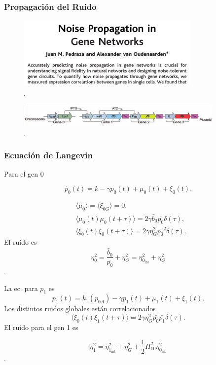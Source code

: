 \documentclass[10pt]{beamer}
\begin{document}
\begin{frame}
\frametitle{Propagaci\'on del Ruido}
\begin{figure}[p]
    \centering
    \includegraphics[width=0.8\textwidth]{pedtitle.png}\\
    \tiny \cite{pedraza05}.
\end{figure}

\begin{figure}[p]
    \centering
    \includegraphics[width=0.9\textwidth]{circuitex.png}\\
    \tiny \cite{pedraza05}.
\end{figure}

\end{frame}

\begin{frame}
\frametitle{Ecuaci\'on de Langevin}

Para el gen $0$

\begin{equation*}
  \dot{p_0}(t) = k - \gamma p_0(t) + \mu_0(t) + \xi_{0}(t).
\end{equation*}

\begin{align*}
  &\langle \mu_0 \rangle = \langle \xi_{0G} \rangle = 0,\\
  &\langle \mu_0(t)\mu_0(t+\tau) \rangle = 2 \gamma \tilde{b_0} \overline{p_0} \delta(\tau),\\
  &\langle \xi_{0}(t)\xi_{0}(t+\tau) \rangle = 2 \gamma \eta_G^2 \overline{p_0}^2 \delta(\tau).
\end{align*}
El ruido es
$$\eta_0^2 = \frac{\tilde{b_0}}{\overline{p_0}} + \eta_G^2 = \eta_{0_{\text{int}}}^2 + \eta_G^2$$.
\end{frame}

\begin{frame}

La ec. para $p_1$ es
  \begin{equation*}
    \dot{p_1}(t) = k_1(p_{0A}) - \gamma p_1(t) + \mu_1(t) + \xi_{1}(t).
  \end{equation*}
Los distintos ruidos globales est\'an correlacionados
  \begin{equation*}
    \langle \xi_{0}(t)\xi_{1}(t+\tau) \rangle = 2 \gamma \eta_G^2 \bar{p_0}\bar{p_1} \delta(\tau).
  \end{equation*}
El ruido para el gen 1 es

$$\eta_1^2 = \eta_{1_{\text{int}}}^2 + \eta_G^2 + \frac{1}{2}H_{10}^2\eta_{0_{\text{int}}}^2$$.

\end{frame}
\end{document}
